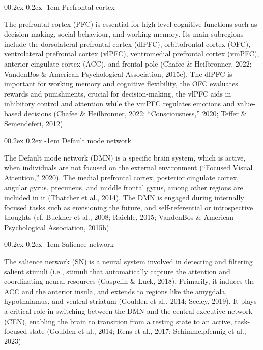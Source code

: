 \documentclass[
  stu, a4paper,floatsintext]{apa7}
\makeatletter
\let\oldparagraph\paragraph
\renewcommand{\paragraph}[1]{\oldparagraph{#1}\mbox{}}
\renewcommand{\paragraph}{\@startsection{paragraph}{4}{\parindent}%
  {0\baselineskip \@plus 0.2ex \@minus 0.2ex}%
  {-1em}%
  {\normalfont\normalsize\bfseries\itshape\typesectitle}}
\renewcommand{\paragraph}{\@startsection{paragraph}{4}{\parindent}%
  {0\baselineskip \@plus 0.2ex \@minus 0.2ex}%
  {-1em}%
  {\normalfont\normalsize\bfseries\typesectitle}}
\makeatother
\begin{document}
\paragraph{Prefrontal cortex}\label{prefrontal-cortex}

The prefrontal cortex (PFC) is essential for high-level cognitive functions such as decision-making, social behaviour, and working memory.
Its main subregions include the dorsolateral prefrontal cortex (dlPFC), orbitofrontal cortex (OFC), ventrolateral prefrontal cortex (vlPFC), ventromedial prefrontal cortex (vmPFC), anterior cingulate cortex (ACC), and frontal pole (Chafee \& Heilbronner, 2022; VandenBos \& American Psychological Association, 2015c).
The dlPFC is important for working memory and cognitive flexibility, the OFC evaluates rewards and punishments, crucial for decision-making, the vlPFC aids in inhibitory control and attention while the vmPFC regulates emotions and value-based decisions (Chafee \& Heilbronner, 2022; {``Consciousness,''} 2020; Teffer \& Semendeferi, 2012).

\paragraph{Default mode network}\label{default-mode-network}

The Default mode network (DMN) is a specific brain system, which is active, when individuals are not focused on the external environment ({``Focused Visual Attention,''} 2020).
The medial prefrontal cortex, posterior cingulate cortex, angular gyrus, precuneus, and middle frontal gyrus, among other regions are included in it (Thatcher et al., 2014).
The DMN is engaged during internally focused tasks such as envisioning the future, and self-referential or introspective thoughts (cf. Buckner et al., 2008; Raichle, 2015; VandenBos \& American Psychological Association, 2015b)

\paragraph{Salience network}\label{salience-network}

The salience network (SN) is a neural system involved in detecting and filtering salient stimuli (i.e., stimuli that automatically capture the attention and coordinating neural resources (Gaspelin \& Luck, 2018).
Primarily, it induces the ACC and the anterior insula, and extends to regions like the amygdala, hypothalamus, and ventral striatum (Goulden et al., 2014; Seeley, 2019).
It plays a critical role in switching between the DMN and the central executive network (CEN), enabling the brain to transition from a resting state to an active, task-focused state (Goulden et al., 2014; Rens et al., 2017; Schimmelpfennig et al., 2023)
\end{document}
